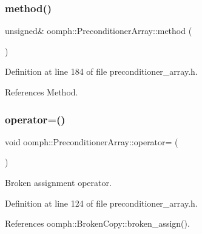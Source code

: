 \subsubsection{\texorpdfstring{method()}{method()}}
{\footnotesize\ttfamily unsigned\& oomph\+::\+Preconditioner\+Array\+::method (\begin{DoxyParamCaption}{ }\end{DoxyParamCaption})\hspace{0.3cm}{\ttfamily [inline]}}



Definition at line 184 of file preconditioner\+\_\+array.\+h.



References Method.

\mbox{\label{classoomph_1_1PreconditionerArray_a29577eaaaf9055e40e54538ec607dba4}} 
\subsubsection{\texorpdfstring{operator=()}{operator=()}}
{\footnotesize\ttfamily void oomph\+::\+Preconditioner\+Array\+::operator= (\begin{DoxyParamCaption}\item[{const \hyperlink{classoomph_1_1PreconditionerArray}{Preconditioner\+Array} \&}]{ }\end{DoxyParamCaption})\hspace{0.3cm}{\ttfamily [inline]}}



Broken assignment operator. 



Definition at line 124 of file preconditioner\+\_\+array.\+h.



References oomph\+::\+Broken\+Copy\+::broken\+\_\+assign().

\mbox{\label{classoomph_1_1PreconditionerArray_ac575b5a9fe045dcba7e42aa0c445a7ee}} 
